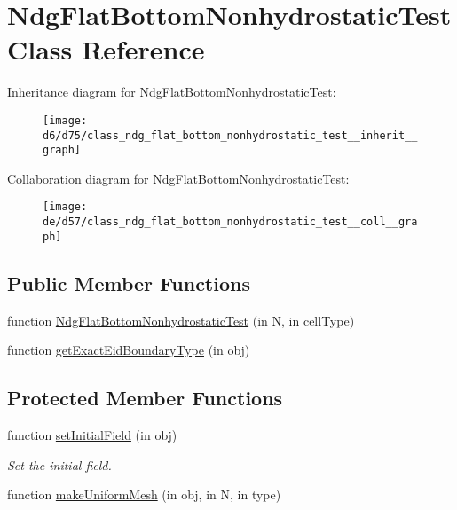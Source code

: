 \hypertarget{class_ndg_flat_bottom_nonhydrostatic_test}{}\section{Ndg\+Flat\+Bottom\+Nonhydrostatic\+Test Class Reference}
\label{class_ndg_flat_bottom_nonhydrostatic_test}


Inheritance diagram for Ndg\+Flat\+Bottom\+Nonhydrostatic\+Test\+:
\nopagebreak
\begin{figure}[H]
\begin{center}
\leavevmode
\texttt{[image: d6/d75/class\_ndg\_flat\_bottom\_nonhydrostatic\_test\_\_inherit\_\_graph]}
\end{center}
\end{figure}


Collaboration diagram for Ndg\+Flat\+Bottom\+Nonhydrostatic\+Test\+:
\nopagebreak
\begin{figure}[H]
\begin{center}
\leavevmode
\texttt{[image: de/d57/class\_ndg\_flat\_bottom\_nonhydrostatic\_test\_\_coll\_\_graph]}
\end{center}
\end{figure}
\subsection*{Public Member Functions}
\begin{DoxyCompactItemize}
\item 
function \hyperlink{class_ndg_flat_bottom_nonhydrostatic_test_af42e8800060d2a82849cfff1a881d2c0}{Ndg\+Flat\+Bottom\+Nonhydrostatic\+Test} (in N, in cell\+Type)
\item 
function \hyperlink{class_ndg_flat_bottom_nonhydrostatic_test_a96f11022d4e2f08f67d1242f3ac3b6e7}{get\+Exact\+Eid\+Boundary\+Type} (in obj)
\end{DoxyCompactItemize}
\subsection*{Protected Member Functions}
\begin{DoxyCompactItemize}
\item 
function \hyperlink{class_ndg_flat_bottom_nonhydrostatic_test_a9ea66ba01da4b35a881bdf8cf39bcfde}{set\+Initial\+Field} (in obj)
\begin{DoxyCompactList}\small\item\em Set the initial field. \end{DoxyCompactList}\item 
function \hyperlink{class_ndg_flat_bottom_nonhydrostatic_test_a9a2ebbd7efcdb7cca1c96a2ca056729b}{make\+Uniform\+Mesh} (in obj, in N, in type)
\end{DoxyCompactItemize}
